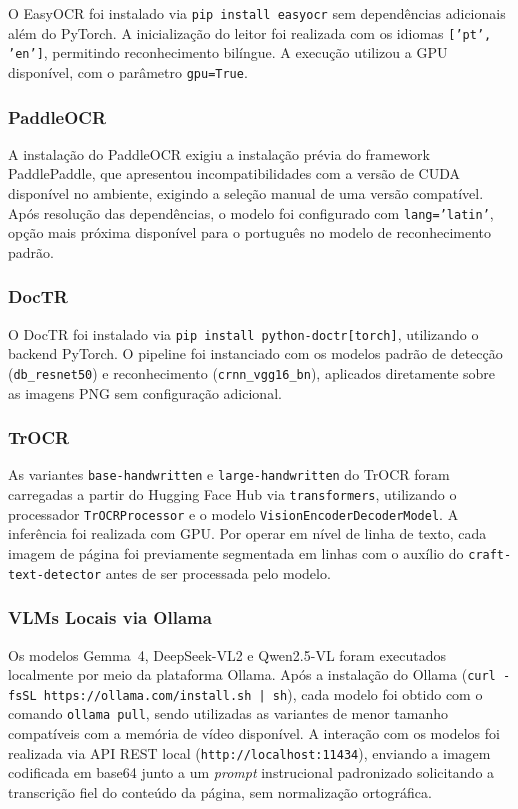 \documentclass[
  12pt,
  oneside,
  a4paper,
  chapter=TITLE,
  section=TITLE,
  english,
  brazil
]{abntex2}
\begin{document}
O EasyOCR foi instalado via \texttt{pip install easyocr} sem dependências adicionais
além do PyTorch. A inicialização do leitor foi realizada com os idiomas
\texttt{['pt', 'en']}, permitindo reconhecimento bilíngue. A execução utilizou a GPU
disponível, com o parâmetro \texttt{gpu=True}.

\subsubsection{PaddleOCR}

A instalação do PaddleOCR exigiu a instalação prévia do framework PaddlePaddle, que
apresentou incompatibilidades com a versão de CUDA disponível no ambiente, exigindo
a seleção manual de uma versão compatível. Após resolução das dependências, o modelo
foi configurado com \texttt{lang='latin'}, opção mais próxima disponível para o
português no modelo de reconhecimento padrão.

\subsubsection{DocTR}

O DocTR foi instalado via \texttt{pip install python-doctr[torch]}, utilizando o
backend PyTorch. O pipeline foi instanciado com os modelos padrão de detecção
(\texttt{db\_resnet50}) e reconhecimento (\texttt{crnn\_vgg16\_bn}), aplicados
diretamente sobre as imagens PNG sem configuração adicional.

\subsubsection{TrOCR}

As variantes \texttt{base-handwritten} e \texttt{large-handwritten} do TrOCR foram
carregadas a partir do Hugging Face Hub via \texttt{transformers}, utilizando o
processador \texttt{TrOCRProcessor} e o modelo \texttt{VisionEncoderDecoderModel}.
A inferência foi realizada com GPU. Por operar em nível de linha de texto, cada
imagem de página foi previamente segmentada em linhas com o auxílio do
\texttt{craft-text-detector} antes de ser processada pelo modelo.

\subsubsection{VLMs Locais via Ollama}

Os modelos Gemma~4, DeepSeek-VL2 e Qwen2.5-VL foram executados localmente por meio
da plataforma Ollama. Após a instalação do Ollama (\texttt{curl -fsSL
https://ollama.com/install.sh | sh}), cada modelo foi obtido com o comando
\texttt{ollama pull}, sendo utilizadas as variantes de menor tamanho compatíveis com
a memória de vídeo disponível. A interação com os modelos foi realizada via API REST
local (\texttt{http://localhost:11434}), enviando a imagem codificada em base64
junto a um \textit{prompt} instrucional padronizado solicitando a transcrição fiel
do conteúdo da página, sem normalização ortográfica.
\end{document}
